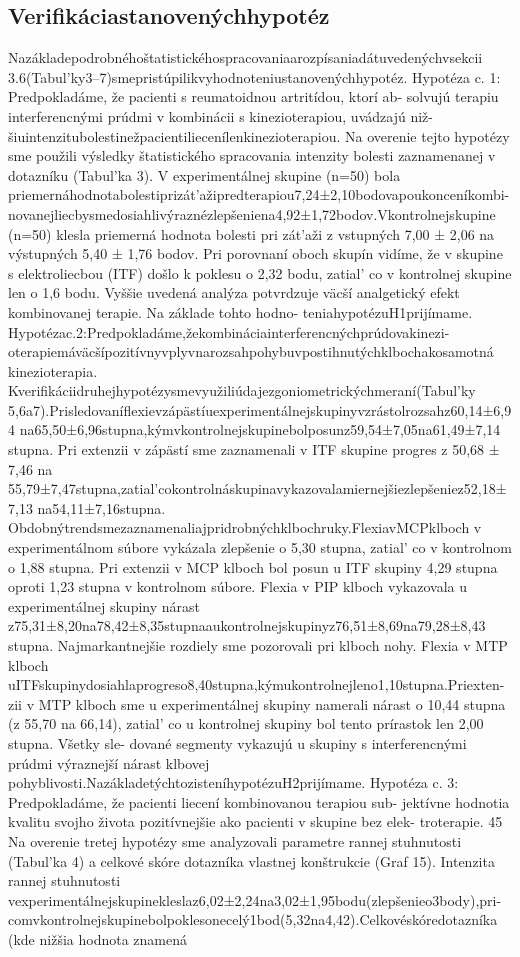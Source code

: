 \subsection{Verifikáciastanovenýchhypotéz}

Nazákladepodrobnéhoštatistickéhospracovaniaarozpísaniadátuvedenýchvsekcii 3.6(Tabul’ky3--7)smepristúpilikvyhodnoteniustanovenýchhypotéz. Hypotéza c. 1: Predpokladáme, že pacienti s reumatoidnou artritídou, ktorí ab- solvujú terapiu interferencnými prúdmi v kombinácii s kinezioterapiou, uvádzajú niž- šiuintenzitubolestinežpacientiliecenílenkinezioterapiou. Na overenie tejto hypotézy sme použili výsledky štatistického spracovania intenzity bolesti zaznamenanej v dotazníku (Tabul’ka 3). V experimentálnej skupine (n=50) bola priemernáhodnotabolestiprizát’ažipredterapiou7,24±2,10bodovapoukonceníkombi- novanejliecbysmedosiahlivýraznézlepšeniena4,92±1,72bodov.Vkontrolnejskupine (n=50) klesla priemerná hodnota bolesti pri zát’aži z vstupných 7,00 ± 2,06 na výstupných 5,40 ± 1,76 bodov. Pri porovnaní oboch skupín vidíme, že v skupine s elektroliecbou (ITF) došlo k poklesu o 2,32 bodu, zatial’ co v kontrolnej skupine len o 1,6 bodu. Vyššie uvedená analýza potvrdzuje väcší analgetický efekt kombinovanej terapie. Na základe tohto hodno- teniahypotézuH1prijímame. Hypotézac.2:Predpokladáme,žekombináciainterferencnýchprúdovakinezi- oterapiemáväcšípozitívnyvplyvnarozsahpohybuvpostihnutýchklbochakosamotná kinezioterapia. Kverifikáciidruhejhypotézysmevyužiliúdajezgoniometrickýchmeraní(Tabul’ky 5,6a7).Prisledovaníflexievzápästíuexperimentálnejskupinyvzrástolrozsahz60,14±6,94 na65,50±6,96stupna,kýmvkontrolnejskupinebolposunz59,54±7,05na61,49±7,14 stupna. Pri extenzii v zápästí sme zaznamenali v ITF skupine progres z 50,68 ± 7,46 na 55,79±7,47stupna,zatial’cokontrolnáskupinavykazovalamiernejšiezlepšeniez52,18±7,13 na54,11±7,16stupna. Obdobnýtrendsmezaznamenaliajpridrobnýchklbochruky.FlexiavMCPklboch v experimentálnom súbore vykázala zlepšenie o 5,30 stupna, zatial’ co v kontrolnom o 1,88 stupna. Pri extenzii v MCP klboch bol posun u ITF skupiny 4,29 stupna oproti 1,23 stupna v kontrolnom súbore. Flexia v PIP klboch vykazovala u experimentálnej skupiny nárast z75,31±8,20na78,42±8,35stupnaaukontrolnejskupinyz76,51±8,69na79,28±8,43 stupna. Najmarkantnejšie rozdiely sme pozorovali pri klboch nohy. Flexia v MTP klboch uITFskupinydosiahlaprogreso8,40stupna,kýmukontrolnejleno1,10stupna.Priexten- zii v MTP klboch sme u experimentálnej skupiny namerali nárast o 10,44 stupna (z 55,70 na 66,14), zatial’ co u kontrolnej skupiny bol tento prírastok len 2,00 stupna. Všetky sle- dované segmenty vykazujú u skupiny s interferencnými prúdmi výraznejší nárast klbovej pohyblivosti.NazákladetýchtozisteníhypotézuH2prijímame. Hypotéza c. 3: Predpokladáme, že pacienti liecení kombinovanou terapiou sub- jektívne hodnotia kvalitu svojho života pozitívnejšie ako pacienti v skupine bez elek- troterapie. 45 Na overenie tretej hypotézy sme analyzovali parametre rannej stuhnutosti (Tabul’ka 4) a celkové skóre dotazníka vlastnej konštrukcie (Graf 15). Intenzita rannej stuhnutosti vexperimentálnejskupinekleslaz6,02±2,24na3,02±1,95bodu(zlepšenieo3body),pri- comvkontrolnejskupinebolpoklesonecelý1bod(5,32na4,42).Celkovéskóredotazníka (kde nižšia hodnota znamená 